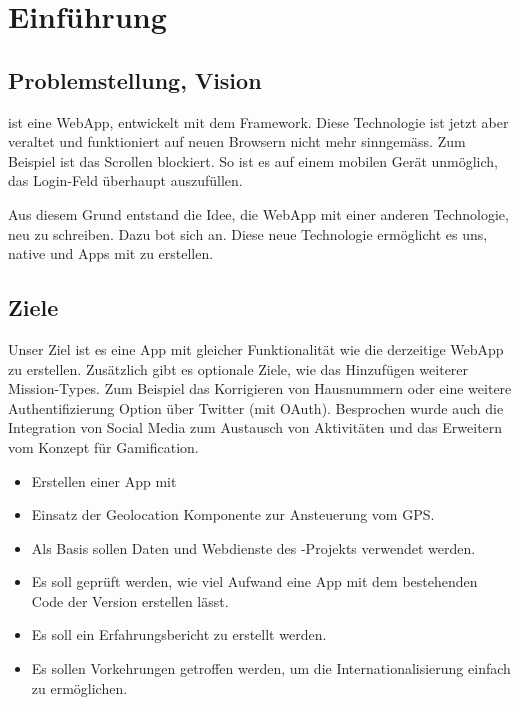 \chapter{Einführung}
\label{tb-einfuehrung}

\section{Problemstellung, Vision}
\kort{} ist eine \gls{WebApp}, entwickelt mit dem  \gls{Framework}.
Diese Technologie ist jetzt aber veraltet und funktioniert auf neuen Browsern nicht mehr sinngemäss.
Zum Beispiel ist das Scrollen blockiert.
So ist es auf einem mobilen Gerät unmöglich, das Login-Feld überhaupt auszufüllen.

Aus diesem Grund entstand die Idee, die \kort{} \gls{WebApp} mit einer anderen Technologie, neu zu schreiben.
Dazu bot sich  an. 
Diese neue Technologie ermöglicht es uns, native  und  Apps mit  zu erstellen. 


\section{Ziele}
Unser Ziel ist es eine  App mit gleicher Funktionalität wie die derzeitige \gls{WebApp} zu erstellen.
Zusätzlich gibt es optionale Ziele, wie das Hinzufügen weiterer Mission-Types.
Zum Beispiel das Korrigieren von Hausnummern oder eine weitere Authentifizierung Option über Twitter (mit \gls{OAuth}).
Besprochen wurde auch die Integration von Social Media zum Austausch von Aktivitäten und das Erweitern vom Konzept für Gamification.

\begin{itemize}
	\item Erstellen einer  App mit 
	\item Einsatz der  Geolocation Komponente zur Ansteuerung vom GPS.
	\item Als Basis sollen Daten und Webdienste des -Projekts verwendet werden.
	\item Es soll geprüft werden, wie viel Aufwand eine  App mit dem bestehenden Code der  Version erstellen lässt.
	\item Es soll ein Erfahrungsbericht zu  erstellt werden.
	\item Es sollen Vorkehrungen getroffen werden, um die Internationalisierung einfach zu ermöglichen.
\end{itemize}


